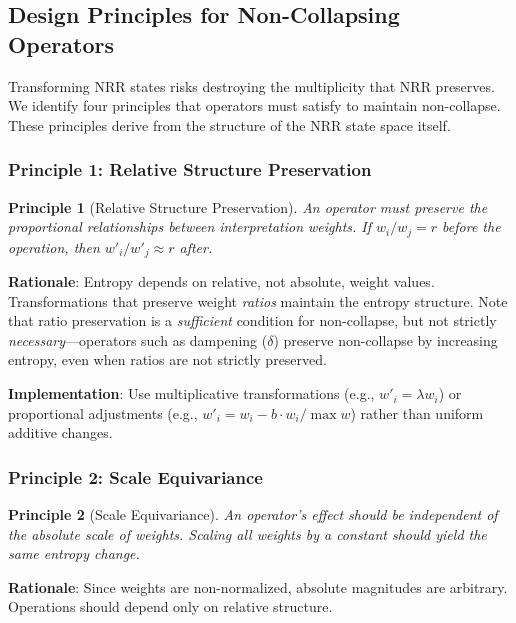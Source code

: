 \documentclass[11pt,a4paper]{article}
\newtheorem{principle}{Principle}
\begin{document}
\subsection{Design Principles for Non-Collapsing Operators}
\label{app:principles}

Transforming NRR states risks destroying the multiplicity that NRR preserves. 
We identify four principles that operators must satisfy to maintain non-collapse. 
These principles derive from the structure of the NRR state space itself.

\subsubsection{Principle 1: Relative Structure Preservation}

\begin{principle}[Relative Structure Preservation]
\label{prin:relative}
An operator must preserve the proportional relationships between 
interpretation weights. If $w_i / w_j = r$ before the operation, 
then $w'_i / w'_j \approx r$ after.
\end{principle}

\textbf{Rationale}: Entropy depends on relative, not absolute, weight 
values. Transformations that preserve weight \textit{ratios} maintain 
the entropy structure. Note that ratio preservation is a \textit{sufficient} 
condition for non-collapse, but not strictly \textit{necessary}---operators 
such as dampening ($\delta$) preserve non-collapse by increasing entropy, 
even when ratios are not strictly preserved.

\textbf{Implementation}: Use multiplicative transformations 
(e.g., $w'_i = \lambda w_i$) or proportional adjustments 
(e.g., $w'_i = w_i - b \cdot w_i / \max w$) rather than uniform 
additive changes.

\subsubsection{Principle 2: Scale Equivariance}

\begin{principle}[Scale Equivariance]
\label{prin:scale}
An operator's effect should be independent of the absolute scale 
of weights. Scaling all weights by a constant should yield the 
same entropy change.
\end{principle}

\textbf{Rationale}: Since weights are non-normalized, absolute 
magnitudes are arbitrary. Operations should depend only on relative 
structure.
\end{document}
